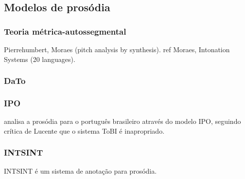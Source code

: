 \subsection{Modelos de prosódia}
\subsubsection{Teoria métrica-autossegmental}
Pierrehumbert, Moraes (pitch analysis by synthesis). ref Moraes, Intonation Systems (20 languages).
\subsubsection{DaTo}

\subsubsection{IPO}
\cite{ipo} analisa a prosódia para o português brasileiro através do modelo IPO,
seguindo crítica de Lucente que o sistema ToBI é inapropriado.
\subsubsection{INTSINT}
INTSINT é um sistema de anotação para prosódia.
